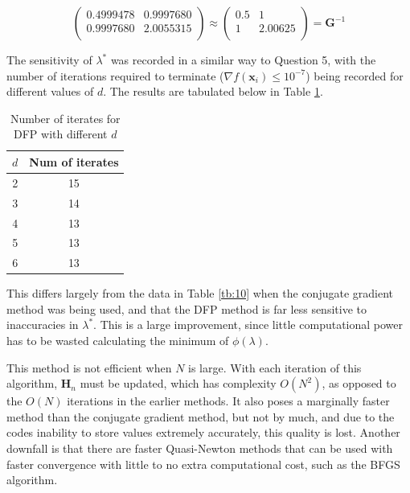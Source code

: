 \documentclass[10pt,a4paper,notitlepage]{article}
\newcommand{\x}{\mathbf{x}}
\newcommand{\h}{\mathbf{H}}
\newcommand{\G}{\mathbf{G}}
\begin{document}
\begin{equation}
\begin{pmatrix}
0.4999478 & 0.9997680\\
0.9997680 & 2.0055315\\
\end{pmatrix}
\approx
\begin{pmatrix}
0.5 & 1\\
1 & 2.00625\\
\end{pmatrix}=\G^{-1}
\end{equation}

The sensitivity of $\lambda^{*}$ was recorded in a similar way to Question 5, with the number of iterations required to terminate ($\nabla f(\x_{i})\leq 10^{-7}$) being recorded for different values of $d$. The results are tabulated below in Table \ref{tb:12}.
\begin{table}[H]
\centering
\begin{tabular}{|c|c|}
\hline $d$ & Num of iterates\\
\hline 2 & 15\\
3 & 14\\
4 & 13\\
5 & 13\\
6 & 13\\
\hline
\end{tabular}
\caption{Number of iterates for DFP with different $d$}\label{tb:12}
\end{table}
This differs largely from the data in Table \ref{tb:10} when the conjugate gradient method was being used, and that the DFP method is far less sensitive to inaccuracies in $\lambda^{*}$. This is a large improvement, since little computational power has to be wasted calculating the minimum of $\phi(\lambda)$.

This method is not efficient when $N$ is large. With each iteration of this algorithm, $\h_{n}$ must be updated, which has complexity $O(N^{2})$, as opposed to the $O(N)$ iterations in the earlier methods. It also poses a marginally faster method than the conjugate gradient method, but not by much, and due to the codes inability to store values extremely accurately, this quality is lost. Another downfall is that there are faster Quasi-Newton methods that can be used with faster convergence with little to no extra computational cost, such as the BFGS algorithm. 
\end{document}
